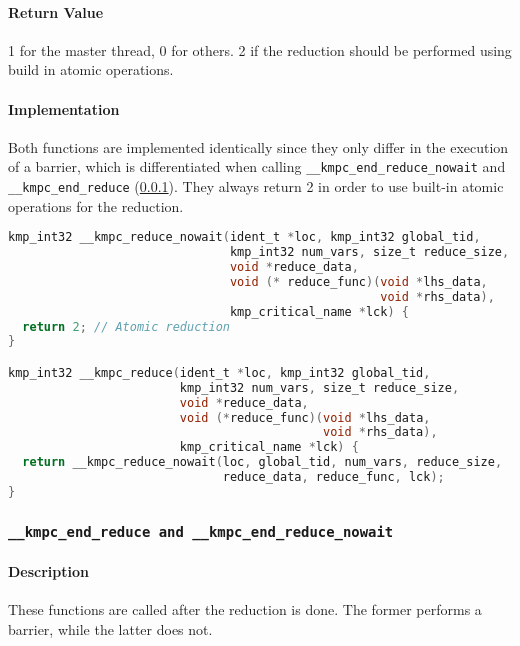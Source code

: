 \paragraph{Return Value} 1 for the master thread, 0 for others. 2 if the reduction should be
performed using build in atomic operations.

\paragraph{Implementation} Both functions are implemented identically since they only differ in the
execution of a barrier, which is differentiated when calling \texttt{\_\_kmpc\_end\_reduce\_nowait}
and \texttt{\_\_kmpc\_end\_reduce} (\cref{subsubsec:kmpc-end-reduce}). They always return 2 in order
to use built-in atomic operations for the reduction.

\begin{lstlisting}[language=C, caption={__kmpc_reduce and __kmpc_reduce_nowait},
                   label={lst:kmpc-reduce}, escapechar=@]
kmp_int32 __kmpc_reduce_nowait(ident_t *loc, kmp_int32 global_tid,
                               kmp_int32 num_vars, size_t reduce_size,
                               void *reduce_data,
                               void (* reduce_func)(void *lhs_data,
                                                    void *rhs_data),
                               kmp_critical_name *lck) {
  return 2; // Atomic reduction
}

kmp_int32 __kmpc_reduce(ident_t *loc, kmp_int32 global_tid,
                        kmp_int32 num_vars, size_t reduce_size,
                        void *reduce_data,
                        void (*reduce_func)(void *lhs_data,
                                            void *rhs_data),
                        kmp_critical_name *lck) {
  return __kmpc_reduce_nowait(loc, global_tid, num_vars, reduce_size,
                              reduce_data, reduce_func, lck);
}
\end{lstlisting}

\subsubsection{\texttt{__kmpc_end_reduce and __kmpc_end_reduce_nowait}}
\label{subsubsec:kmpc-end-reduce}

\paragraph{Description} These functions are called after the reduction is done. The former performs
a barrier, while the latter does not.

